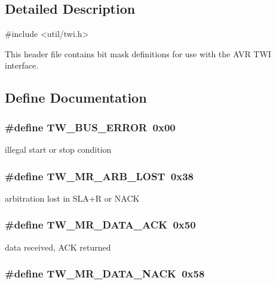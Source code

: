 \subsection{Detailed Description}

\begin{DoxyCode}
 #include <util/twi.h> 
\end{DoxyCode}


This header file contains bit mask definitions for use with the AVR TWI interface. 

\subsection{Define Documentation}
\hypertarget{group__util__twi_ga90d373160b1d0a3f0c454af83c57df71}{
\subsubsection[{TW\_\-BUS\_\-ERROR}]{\setlength{\rightskip}{0pt plus 5cm}\#define TW\_\-BUS\_\-ERROR~0x00}}
\label{group__util__twi_ga90d373160b1d0a3f0c454af83c57df71}
illegal start or stop condition \hypertarget{group__util__twi_gad85222308836bfbe099255662ffb510c}{
\subsubsection[{TW\_\-MR\_\-ARB\_\-LOST}]{\setlength{\rightskip}{0pt plus 5cm}\#define TW\_\-MR\_\-ARB\_\-LOST~0x38}}
\label{group__util__twi_gad85222308836bfbe099255662ffb510c}
arbitration lost in SLA+R or NACK \hypertarget{group__util__twi_ga3c8c79b2ecb8d22358839890161cc33b}{
\subsubsection[{TW\_\-MR\_\-DATA\_\-ACK}]{\setlength{\rightskip}{0pt plus 5cm}\#define TW\_\-MR\_\-DATA\_\-ACK~0x50}}
\label{group__util__twi_ga3c8c79b2ecb8d22358839890161cc33b}
data received, ACK returned \hypertarget{group__util__twi_ga532f0ffa12f684346c74a5cbec15950e}{
\subsubsection[{TW\_\-MR\_\-DATA\_\-NACK}]{\setlength{\rightskip}{0pt plus 5cm}\#define TW\_\-MR\_\-DATA\_\-NACK~0x58}}
